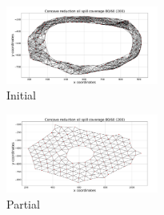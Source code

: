 \documentclass[preprint,12pt]{elsarticle}
\begin{document}
\begin{figure}
\begin{center}
\includegraphics[width=5cm]{figures/OilSpillConcave1}
\end{center}
\caption{Initial\label{concave:OilSpillConcave1}}
\end{figure}

\begin{figure}
\begin{center}
\includegraphics[width=5cm]{figures/OilSpillConcave2}
\end{center}
\caption{Partial\label{concave:OilSpillConcave2}}
\end{figure}
\end{document}
